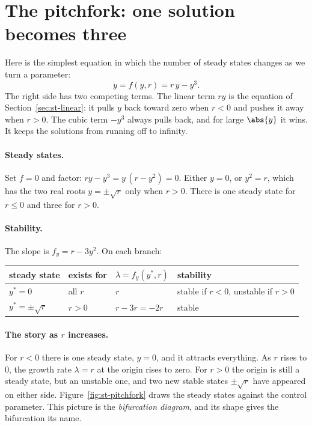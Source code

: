 \section{The pitchfork: one solution becomes three}\label{sec:st-pitchfork}
%

Here is the simplest equation in which the number of steady states changes as
we turn a parameter:
\begin{equation}\label{eq:st-pitchfork}
  \dot y = f(y,r) = r\,y - y^3 .
\end{equation}
The right side has two competing terms. The linear term $ry$ is the equation of
Section~\ref{sec:st-linear}: it pulls $y$ back toward zero when $r < 0$ and pushes
it away when $r > 0$. The cubic term $-y^3$ always pulls back, and for large
$\abs{y}$ it wins. It keeps the solutions from running off to infinity.

\paragraph{Steady states.}
Set $f = 0$ and factor: $ry - y^3 = y\,(r - y^2) = 0$. Either $y = 0$, or
$y^2 = r$, which has the two real roots $y = \pm\sqrt r$ only when $r > 0$.
There is one steady state for $r \le 0$ and three for $r > 0$.

\paragraph{Stability.}
The slope is $f_y = r - 3y^2$. On each branch:
\begin{center}
\begin{tabular}{@{}llll@{}}
  \toprule
  steady state & exists for & $\lambda = f_y(y^*,r)$ & stability \\
  \midrule
  $y^* = 0$         & all $r$ & $r$           & stable if $r < 0$, unstable if $r > 0$ \\
  $y^* = \pm\sqrt r$ & $r > 0$ & $r - 3r = -2r$ & stable \\
  \bottomrule
\end{tabular}
\end{center}

\paragraph{The story as $r$ increases.}
For $r < 0$ there is one steady state, $y = 0$, and it attracts everything.
As $r$ rises to $0$, the growth rate $\lambda = r$ at the origin rises to zero.
For $r > 0$ the origin is still a steady state, but an unstable one, and two new
stable states $\pm\sqrt r$ have appeared on either side.
Figure~\ref{fig:st-pitchfork} draws the steady states against the control
parameter. This picture is the \emph{bifurcation diagram}, and its shape gives
the bifurcation its name.
%

